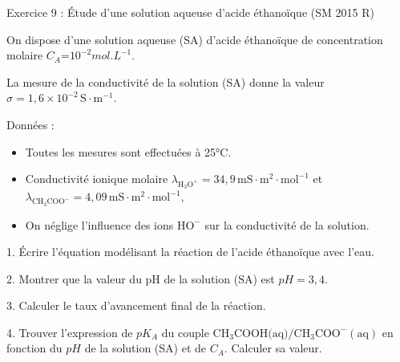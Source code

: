 \documentclass[12pt, french]{article}
\begin{document}
\begin{Box2}{Exercice 9 : Étude d’une solution aqueuse d’acide éthanoïque (SM 2015 R)}

On dispose d’une solution aqueuse (SA) d’acide éthanoïque de concentration molaire $C_A$=$ 10^{-2}mol.L^{-1}$.

La mesure de la conductivité de la solution (SA) donne la valeur $\sigma = 1,6 \times 10^{-2} \, \text{S} \cdot \text{m}^{-1}$.

Données :
\begin{itemize}
    \item Toutes les mesures sont effectuées à 25°C.
    \item Conductivité ionique molaire $\lambda_{\text{H}_3\text{O}^+} = 34,9 \, \text{mS} \cdot \text{m}^2 \cdot \text{mol}^{-1}$ et $\lambda_{\text{CH}_3 \text{COO}^-} = 4,09 \, \text{mS} \cdot \text{m}^2 \cdot \text{mol}^{-1}$,
    \item On néglige l’influence des ions $\text{HO}^-$ sur la conductivité de la solution.
\end{itemize}

1. Écrire l’équation modélisant la réaction de l’acide éthanoïque avec l’eau.

2. Montrer que la valeur du pH de la solution (SA) est $pH = 3,4$.

3. Calculer le taux d’avancement final de la réaction.

4. Trouver l’expression de $pK_A$ du couple $\text{CH}_3 \text{COOH(aq)} / \text{CH}_3 \text{COO}^-(\text{aq})$ en fonction du $pH$ de la solution (SA) et de $C_A$. Calculer sa valeur.
\end{Box2}
\end{document}
